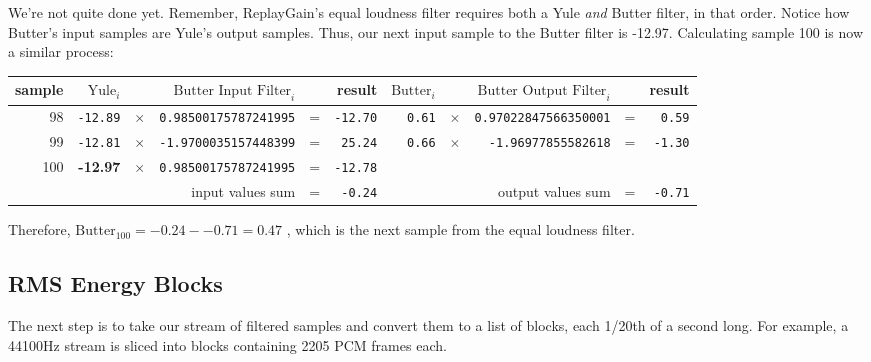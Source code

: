 We're not quite done yet.
Remember, ReplayGain's equal loudness filter requires both
a Yule \textit{and} Butter filter, in that order.
Notice how Butter's input samples are Yule's output samples.
Thus, our next input sample to the Butter filter is -12.97.
Calculating sample 100 is now a similar process:
\begin{table}[h]
{
\begin{tabular}{|r|rcrcr|rcrcr|}
\hline
sample & $\text{Yule}_i$ & & $\text{Butter Input Filter}_i$ & & result &
$\text{Butter}_i$ & & $\text{Butter Output Filter}_i$ & & result \\
\hline
98 & \texttt{-12.89} & $\times$ & \texttt{0.98500175787241995} & = & \texttt{-12.70} &
\texttt{0.61} & $\times$ & \texttt{0.97022847566350001} & = & \texttt{0.59} \\

99 & \texttt{-12.81} & $\times$ & \texttt{-1.9700035157448399} & = & \texttt{25.24} &
\texttt{0.66} & $\times$ & \texttt{-1.96977855582618} & = & \texttt{-1.30} \\

100 & \textbf{-12.97} & $\times$ & \texttt{0.98500175787241995} & = & \texttt{-12.78} &
& & & & \\
\hline
\multicolumn{4}{|r}{input values sum} & = & \texttt{-0.24} &
\multicolumn{3}{r}{output values sum} & = & \texttt{-0.71} \\
\hline
\end{tabular}
}
\end{table}
\par
\noindent
Therefore, $\text{Butter}_{100} = -0.24 - -0.71 = 0.47$
, which is the next sample from the equal loudness filter.

\clearpage

\subsection{RMS Energy Blocks}
The next step is to take our stream of filtered samples and convert
them to a list of blocks, each 1/20th of a second long.
For example, a 44100Hz stream is sliced into blocks containing
2205 PCM frames each.

